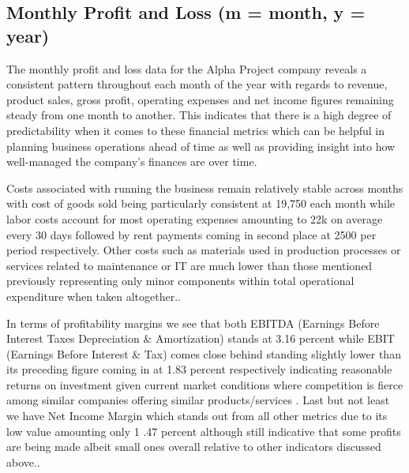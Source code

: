 

\subsection{Monthly Profit and Loss (m = month, y = year)}\label{sec:title}

The monthly profit and loss data for the Alpha Project company reveals a consistent pattern throughout each month of the year with regards to revenue, product sales, gross profit, operating expenses and net income figures remaining steady from one month to another. This indicates that there is a high degree of predictability when it comes to these financial metrics which can be helpful in planning business operations ahead of time as well as providing insight into how well-managed the company's finances are over time. 

Costs associated with running the business remain relatively stable across months with cost of goods sold being particularly consistent at 19,750 each month while labor costs account for most operating expenses amounting to 22k on average every 30 days followed by rent payments coming in second place at 2500 per period respectively. Other costs such as materials used in production processes or services related to maintenance or IT are much lower than those mentioned previously representing only minor components within total operational expenditure when taken altogether.. 

In terms of profitability margins we see that both EBITDA (Earnings Before Interest Taxes Depreciation & Amortization) stands at 3.16 percent while EBIT (Earnings Before Interest & Tax) comes close behind standing slightly lower than its preceding figure coming in at 1.83 percent respectively indicating reasonable returns on investment given current market conditions where competition is fierce among similar companies offering similar products/services . Last but not least we have Net Income Margin which stands out from all other metrics due to its low value amounting only 1 .47 percent although still indicative that some profits are being made albeit small ones overall relative to other indicators discussed above.. 

